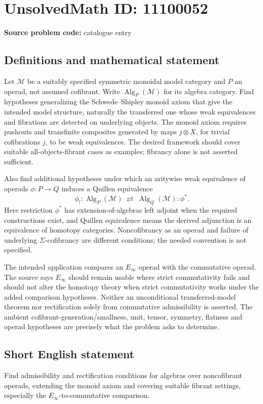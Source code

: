 \documentclass[11pt]{article}
\begin{document}
\section*{UnsolvedMath ID: 11100052}
\textbf{Source problem code:} catalogue entry
\subsection{Definitions and mathematical statement}
Let \(\mathcal M\) be a suitably specified symmetric monoidal model category and \(P\) an operad, not assumed cofibrant. Write \(\operatorname{Alg}_P(\mathcal M)\) for its algebra category. Find hypotheses generalizing the Schwede--Shipley monoid axiom that give the intended model structure, naturally the transferred one whose weak equivalences and fibrations are detected on underlying objects. The monoid axiom requires pushouts and transfinite composites generated by maps \(j\otimes X\), for trivial cofibrations \(j\), to be weak equivalences. The desired framework should cover suitable all-objects-fibrant cases as examples; fibrancy alone is not asserted sufficient.

Also find additional hypotheses under which an aritywise weak equivalence of operads \(\phi:P\to Q\) induces a Quillen equivalence
\[
 \phi_!: \operatorname{Alg}_P(\mathcal M)
 \ \rightleftarrows\ \operatorname{Alg}_Q(\mathcal M):\phi^*.
\]
Here restriction \(\phi^*\) has extension-of-algebras left adjoint when the required constructions exist, and Quillen equivalence means the derived adjunction is an equivalence of homotopy categories. Noncofibrancy as an operad and failure of underlying \(\Sigma\)-cofibrancy are different conditions; the needed convention is not specified.

The intended application compares an \(E_\infty\) operad with the commutative operad. The source says \(E_\infty\) should remain usable where strict commutativity fails and should not alter the homotopy theory when strict commutativity works under the added comparison hypotheses. Neither an unconditional transferred-model theorem nor rectification solely from commutative admissibility is asserted. The ambient cofibrant-generation/smallness, unit, tensor, symmetry, flatness and operad hypotheses are precisely what the problem asks to determine.
\subsection{Short English statement}
Find admissibility and rectification conditions for algebras over noncofibrant operads, extending the monoid axiom and covering suitable fibrant settings, especially the \(E_\infty\)-to-commutative comparison.
\end{document}
